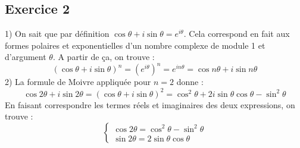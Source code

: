 \documentclass{article}
\begin{document}
\subsection{Exercice 2}
1) On sait que par définition $\cos{\theta}+i\sin{\theta} = e^{i\theta}$. Cela correspond en fait aux formes polaires et exponentielles d'un nombre complexe de module 1 et d'argument $\theta$. A partir de ça, on trouve : 
\begin{equation*}
    (\cos{\theta}+i\sin{\theta})^n=(e^{i\theta})^n=e^{in\theta}=\cos{n\theta}+i\sin{n\theta}
\end{equation*}
2) La formule de Moivre appliquée pour $n = 2$ donne : 
\begin{equation*}
    \cos{2\theta}+i\sin{2\theta} = (\cos{\theta}+i\sin{\theta})^2 = \cos^2{\theta}+2i\sin{\theta}\cos{\theta}-\sin^2{\theta}
\end{equation*}
En faisant correspondre les termes réels et imaginaires des deux expressions, on trouve :
\begin{equation*}
\begin{cases}
    \cos{2\theta} = \cos^2{\theta}-\sin^2{\theta}\\ \sin{2\theta}=2\sin{\theta}\cos{\theta}
\end{cases}
\end{equation*}
\end{document}
